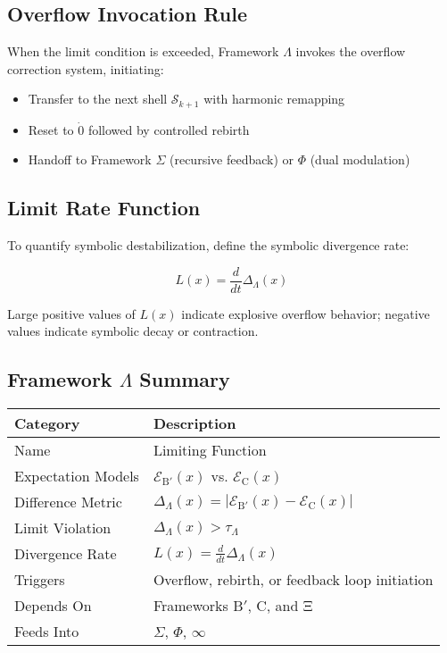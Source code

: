 \subsection*{Overflow Invocation Rule}

When the limit condition is exceeded, Framework $\Lambda$ invokes the overflow correction system, initiating:
\begin{itemize}
  \item Transfer to the next shell $\mathcal{S}_{k+1}$ with harmonic remapping
  \item Reset to $\dot{0}$ followed by controlled rebirth
  \item Handoff to Framework $\Sigma$ (recursive feedback) or $\Phi$ (dual modulation)
\end{itemize}

\subsection*{Limit Rate Function}

To quantify symbolic destabilization, define the symbolic divergence rate:

\[
L(x) = \frac{d}{dt} \Delta_\Lambda(x)
\]

Large positive values of $L(x)$ indicate explosive overflow behavior; negative values indicate symbolic decay or contraction.

\subsection*{Framework $\Lambda$ Summary}

\begin{center}
\begin{tabular}{|l|l|}
\hline
\textbf{Category} & \textbf{Description} \\
\hline
Name & Limiting Function \\
Expectation Models & $\mathcal{E}_{\text{B$'$}}(x)$ vs. $\mathcal{E}_{\text{C}}(x)$ \\
Difference Metric & $\Delta_\Lambda(x) = |\mathcal{E}_{\text{B$'$}}(x) - \mathcal{E}_{\text{C}}(x)|$ \\
Limit Violation & $\Delta_\Lambda(x) > \tau_\Lambda$ \\
Divergence Rate & $L(x) = \frac{d}{dt} \Delta_\Lambda(x)$ \\
Triggers & Overflow, rebirth, or feedback loop initiation \\
Depends On & Frameworks B$'$, C, and Ξ \\
Feeds Into & $\Sigma$, $\Phi$, $\infty$ \\
\hline
\end{tabular}
\end{center}

